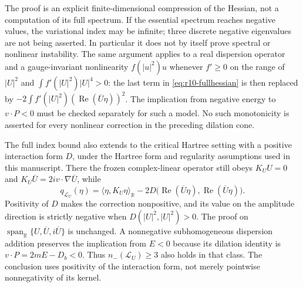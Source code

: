 \begin{remark}
The proof is an explicit finite-dimensional compression of the
Hessian, not a computation of its full spectrum.  If the essential
spectrum reaches negative values, the variational index may be
infinite; three discrete negative eigenvalues are not being asserted.
In particular it
does not by itself prove spectral or nonlinear instability.  The same
argument applies to a real dispersion operator and a gauge-invariant
nonlinearity $f(|u|^2)u$ whenever $f'\ge0$ on the range of $|U|^2$
and $\int f'(|U|^2)|U|^4>0$: the last term in
\eqref{eq:r10-fullhessian} is then replaced by
$-2\int f'(|U|^2)(\operatorname{Re}(\overline U\eta))^2$.
The implication from negative energy to $v\cdot P<0$ must be checked
separately for such a model.  No such monotonicity is asserted for
every nonlinear correction in the preceding dilation cone.
\end{remark}

\begin{remark}
The full index bound also extends to the critical Hartree setting
with a positive interaction form $D$, under the Hartree form and
regularity assumptions used in this manuscript.  There the frozen
complex-linear operator still obeys $K_UU=0$ and
$K_U\overline U=2iv\cdot\nabla\overline U$, while
\[
 q_{\mathcal L_U}(\eta)=\langle\eta,K_U\eta\rangle_{\mathbb R}
 -2D\bigl(\operatorname{Re}(\overline U\eta),
          \operatorname{Re}(\overline U\eta)\bigr).
\]
Positivity of $D$ makes the correction nonpositive, and its value
on the amplitude direction is strictly negative when
$D(|U|^2,|U|^2)>0$.  The proof on
$\operatorname{span}_{\mathbb R}\{U,\overline U,i\overline U\}$
is unchanged.  A nonnegative subhomogeneous dispersion addition
preserves the implication from $E<0$ because its dilation identity
is $v\cdot P=2mE-D_b<0$.  Thus $n_-(\mathcal L_U)\ge3$
also holds in that class.  The conclusion uses positivity of the
interaction form, not merely pointwise nonnegativity of its kernel.
\end{remark}

